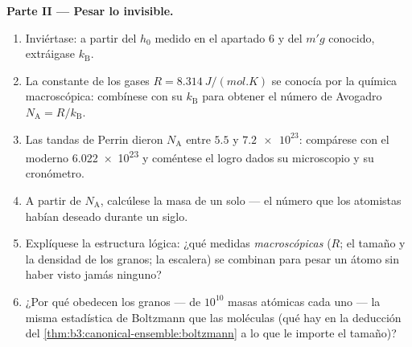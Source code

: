 \begin{problem}
\medskip\noindent\textbf{Parte II --- Pesar lo invisible.}
\begin{enumerate}[resume]
  \item Inviértase: a partir del $h_0$ medido en el apartado 6 y del
        $m'g$ conocido, extráigase $k_{\text{B}}$.
  \item La constante de los gases $R = \qty{8.314}{J/(mol.K)}$ se conocía
        por la química macroscópica: combínese con su
        $k_{\text{B}}$ para obtener el número de Avogadro $N_{\text{A}} =
        R/k_{\text{B}}$.
  \item Las tandas de Perrin dieron $N_{\text{A}}$ entre $5.5$ y
        $\num{7.2e23}$: compárese con el moderno
        \num{6.022e23} y coméntese el logro dados su microscopio y su
        cronómetro.
  \item A partir de $N_{\text{A}}$, calcúlese la masa de un solo
         --- el número que los atomistas habían deseado
        durante un siglo.
  \item Explíquese la estructura lógica: ¿qué medidas \emph{macroscópicas}
        ($R$; el tamaño y la densidad de los granos; la escalera) se
        combinan para pesar un átomo sin haber visto jamás ninguno?
  \item ¿Por qué obedecen los granos --- de $10^{10}$ masas atómicas cada
        uno --- la misma estadística de Boltzmann que las moléculas (qué
        hay en la deducción del
        \cref{thm:b3:canonical-ensemble:boltzmann} a lo que le importe el
        tamaño)?
\end{enumerate}


\end{problem}

